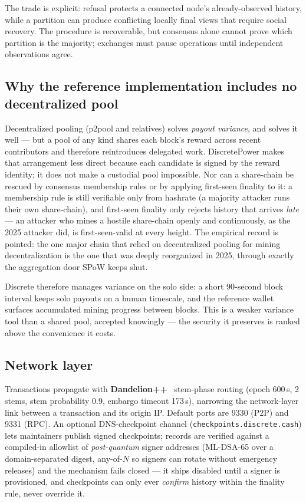 \documentclass[11pt,a4paper]{article}
\newcommand{\code}[1]{\texttt{\small #1}}
\begin{document}
The trade is explicit: refusal protects a connected node's already-observed
history, while a partition can produce conflicting locally final views that
require social recovery. The procedure is recoverable, but consensus alone
cannot prove which partition is the majority; exchanges must pause operations
until independent observations agree.

\subsection{Why the reference implementation includes no decentralized pool}\label{sec:nopool}

Decentralized pooling (p2pool and relatives) solves \emph{payout variance},
and solves it well --- but a pool of any kind shares each block's reward across
recent contributors and therefore reintroduces delegated work. DiscretePower
makes that arrangement less direct because each candidate is signed by the
reward identity; it does not make a custodial pool impossible. Nor can a
share-chain be rescued by consensus membership rules
or by applying first-seen finality to it: a membership rule is still
verifiable only from hashrate (a majority attacker runs their own
share-chain), and first-seen finality only rejects history that arrives
\emph{late} --- an attacker who mines a hostile share-chain openly and
continuously, as the 2025 attacker did, is first-seen-valid at every height.
The empirical record is pointed: the one major chain that relied on
decentralized pooling for mining decentralization is the one that was deeply
reorganized in 2025, through exactly the aggregation door SPoW keeps shut.

Discrete therefore manages variance on the solo side: a short 90-second block
interval keeps solo payouts on a human timescale, and the reference wallet
surfaces accumulated mining progress between blocks. This is a weaker
variance tool than a shared pool, accepted knowingly --- the security it
preserves is ranked above the convenience it costs.

\subsection{Network layer}\label{sec:network}

Transactions propagate with \textbf{Dandelion++}~\cite{dandelion} stem-phase
routing (epoch 600\,s, 2 stems, stem probability 0.9, embargo timeout
173\,s), narrowing the network-layer link between a transaction and its
origin IP. Default ports are 9330 (P2P) and 9331 (RPC). An optional
DNS-checkpoint channel (\code{checkpoints.discrete.cash}) lets maintainers
publish signed checkpoints; records are verified against a compiled-in
allowlist of \emph{post-quantum} signer addresses (ML-DSA-65 over a
domain-separated digest, any-of-$N$ so signers can rotate without emergency
releases) and the mechanism fails closed --- it ships disabled until a signer
is provisioned, and checkpoints can only ever \emph{confirm} history within
the finality rule, never override it.
\end{document}
